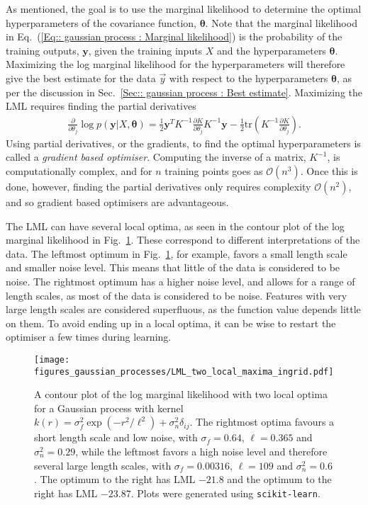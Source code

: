 \documentclass[twoside,english]{uiofysmaster}
\begin{document}
{{As mentioned, the goal is to use the marginal likelihood to determine the optimal hyperparameters of the covariance function, $\boldsymbol{\theta}$. Note that the marginal likelihood in Eq.~(\ref{Eq:: gaussian process : Marginal likelihood}) is the probability of the training outputs, $\textbf{y}$, given the training inputs $X$ and the hyperparameters $\boldsymbol{\theta}$. Maximizing the log marginal likelihood for the hyperparameters will therefore give the best estimate for the data $\vec{y}$ with respect to the hyperparameters $\boldsymbol{\theta}$, as per the discussion in Sec.~\ref{Sec:: gaussian process : Best estimate}. Maximizing the LML requires finding the partial derivatives 
\begin{align}
\frac{\partial}{\partial \theta_j}
 \log p(\textbf{y}|X, \boldsymbol{\theta}) = \frac{1}{2} \textbf{y}^T K^{-1} \frac{\partial K}{\partial \theta_j} K^{-1} \textbf{y} - \frac{1}{2} \text{tr} (K^{-1} \frac{\partial K}{\partial \theta_j}).
\end{align}
Using partial derivatives, or the gradients, to find the optimal hyperparameters is called a \textit{gradient based optimiser}. Computing the inverse of a matrix, $K^{-1}$, is computationally complex, and for $n$ training points goes as $\mathcal{O}(n^3)$. Once this is done, however, finding the partial derivatives only requires complexity $\mathcal{O}(n^2)$, and so gradient based optimisers are advantageous.

The LML can have several local optima, as seen in the contour plot of the log marginal likelihood in Fig.~\ref{Fig:: gaussian process : LML several local optima}. These correspond to different interpretations of the data. The leftmost optimum in Fig.~\ref{Fig:: gaussian process : LML several local optima}, for example, favors a small length scale and smaller noise level. This means that little of the data is considered to be noise. The rightmost optimum has a higher noise level, and allows for a range of length scales, as most of the data is considered to be noise. Features with very large length scales are considered superfluous, as the function value depends little on them. To avoid ending up in a local optima, it can be wise to restart the optimiser a few times during learning.

\begin{figure}
\centering
\texttt{[image: figures\_gaussian\_processes/LML\_two\_local\_maxima\_ingrid.pdf]}
\caption{A contour plot of the log marginal likelihood with two local optima for a Gaussian process with kernel $k(r) = \sigma_f^2 \exp(- r^2 / \ell^2) + \sigma_n^2 \delta_{ij}$. The rightmost optima favours a short length scale and low noise, with $\sigma_f = 0.64$, $\ell = 0.365$ and $\sigma^2_n = 0.29$, while the leftmost favors a high noise level and therefore several large length scales, with $\sigma_f = 0.00316$, $\ell = 109$ and $\sigma^2_n = 0.6$. The optimum to the right has LML $-21.8$ and the optimum to the right has LML $-23.87$. Plots were generated using {\tt scikit-learn}.}
\label{Fig:: gaussian process : LML several local optima}
\end{figure}


}}
\end{document}
